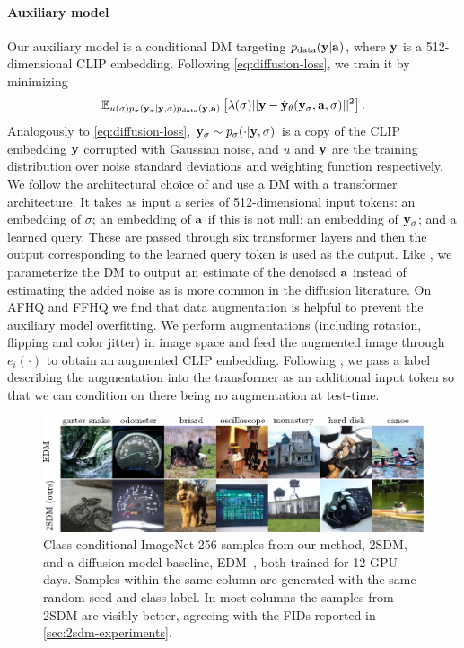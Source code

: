 \paragraph{Auxiliary model}
Our auxiliary model is a conditional DM targeting $p_{\rm{data}}({\mathbf{y}}|{\mathbf{a}})$, where ${\mathbf{y}}$ is a 512-dimensional CLIP embedding. Following \cref{eq:diffusion-loss}, we train it by minimizing
\begin{equation}
\label{eq:auxiliary-model-objective}
    \mathbb{E}_{u(\sigma)p_\sigma({\mathbf{y}}_\sigma|{\mathbf{y}},\sigma)p_{\rm{data}}({\mathbf{y}},{\mathbf{a}})} \left[ \lambda(\sigma) \lvert\lvert {\mathbf{y}} - \hat{{\mathbf{y}}}_\theta({\mathbf{y}}_\sigma, {\mathbf{a}}, \sigma) \rvert\rvert^2 \right].
\end{equation}
Analogously to \cref{eq:diffusion-loss}, ${\mathbf{y}}_\sigma \sim p_\sigma(\cdot|{\mathbf{y}},\sigma)$ is a copy of the CLIP embedding ${\mathbf{y}}$ corrupted with Gaussian noise, and $u$ and ${\mathbf{y}}$ are the training distribution over noise standard deviations and weighting function respectively.
We follow the architectural choice of \citet{ramesh2022hierarchical} and use a DM with a transformer architecture. It takes as input a series of 512-dimensional input tokens: an embedding of $\sigma$; an embedding of ${\mathbf{a}}$ if this is not null; an embedding of ${\mathbf{y}}_\sigma$; and a learned query. These are passed through six transformer layers and then the output corresponding to the learned query token is used as the output. Like \citet{ramesh2022hierarchical}, we parameterize the DM to output an estimate of the denoised ${\mathbf{a}}$ instead of estimating the added noise as is more common in the diffusion literature.
%
On AFHQ and FFHQ we find that data augmentation is helpful to prevent the auxiliary model overfitting. We perform augmentations (including rotation, flipping and color jitter) in image space and feed the augmented image through $e_i(\cdot)$ to obtain an augmented CLIP embedding. Following \citet{karras2022elucidating}, we pass a label describing the augmentation into the transformer as an additional input token so that we can condition on there being no augmentation at test-time.

\begin{figure}[t]
    \includegraphics[width=\textwidth]{figs/2sdm/2SDM-main-fig.pdf}
    \caption{Class-conditional ImageNet-256 samples from our method, 2SDM, and a diffusion model baseline, EDM~\citep{karras2022elucidating}, both trained for 12 GPU days. Samples within the same column are generated with the same random seed and class label. In most columns the samples from 2SDM are visibly better, agreeing with the FIDs reported in \cref{sec:2sdm-experiments}.}
    \label{fig:latent-imagenet-samples}
\end{figure}

